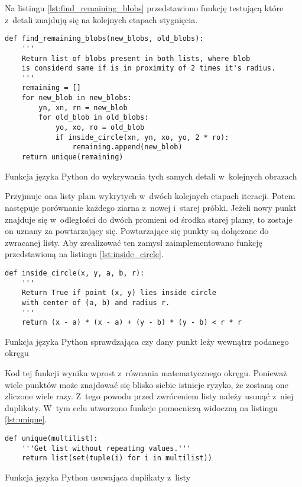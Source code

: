 Na listingu \ref{lst:find_remaining_blobs} przedstawiono funkcję testującą
które z~detali znajdują się na kolejnych etapach stygnięcia.
\begin{listing}[htbp]
\begin{verbatim}
def find_remaining_blobs(new_blobs, old_blobs):
    '''
    Return list of blobs present in both lists, where blob
    is considerd same if is in proximity of 2 times it's radius.
    '''
    remaining = []
    for new_blob in new_blobs:
        yn, xn, rn = new_blob
        for old_blob in old_blobs:
            yo, xo, ro = old_blob
            if inside_circle(xn, yn, xo, yo, 2 * ro):
                remaining.append(new_blob)
    return unique(remaining)
\end{verbatim}
\caption{Funkcja języka Python do wykrywania tych samych detali w~kolejnych
         obrazach}
\label{lst:find_remaining_blobs}
\end{listing}
Przyjmuje ona listy plam wykrytych w~dwóch kolejnych etapach iteracji.
Potem następuje porównanie każdego ziarna z~nowej i~starej próbki.
Jeżeli nowy punkt znajduje się w~odległości do dwóch promieni od środka
starej plamy, to zostaje on uznany za powtarzający się.
Powtarzające się punkty są dołączane do zwracanej listy.
Aby zrealizować ten zamysł zaimplementowano funkcję przedstawioną na listingu
\ref{lst:inside_circle}.
\begin{listing}[htbp]
\begin{verbatim}
def inside_circle(x, y, a, b, r):
    '''
    Return True if point (x, y) lies inside circle 
    with center of (a, b) and radius r.
    '''
    return (x - a) * (x - a) + (y - b) * (y - b) < r * r
\end{verbatim}
\caption{Funkcja języka Python sprawdzająca czy dany punkt leży wewnątrz
         podanego okręgu}
\label{lst:inside_circle}
\end{listing}
Kod tej funkcji wynika wprost z~równania matematycznego okręgu.
Ponieważ wiele punktów może znajdować się blisko siebie istnieje ryzyko,
że zostaną one zliczone wiele razy.
Z~tego powodu przed zwróceniem listy należy usunąć z~niej duplikaty.
W~tym celu utworzono funkcje pomocniczą widoczną na listingu \ref{lst:unique}.
\begin{listing}[htbp]
\begin{verbatim}
def unique(multilist):
    '''Get list without repeating values.'''
    return list(set(tuple(i) for i in multilist))
\end{verbatim}
\caption{Funkcja języka Python usuwająca duplikaty z~listy}
\label{lst:unique}
\end{listing}
